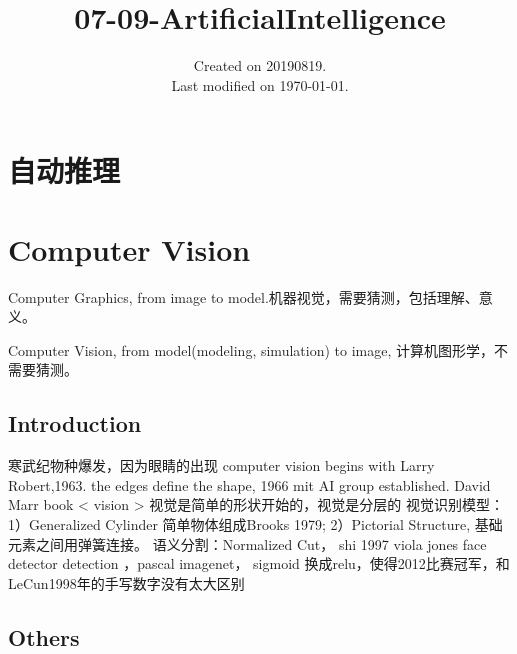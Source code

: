 \documentclass[UTF8]{../computerUniverse}
\begin{document}
\title{07-09-ArtificialIntelligence}
\date{Created on 20190819.\\   Last modified on \today.}
\maketitle
\tableofcontents


\chapter{自动推理}

\chapter{Computer Vision}


Computer Graphics, from image to model.机器视觉，需要猜测，包括理解、意义。

Computer Vision, from model(modeling, simulation) to image, 计算机图形学，不需要猜测。


\section{Introduction}
    寒武纪物种爆发，因为眼睛的出现
    computer vision begins with Larry Robert,1963. the edges define the shape, 1966 mit AI group established. 
    David Marr book < vision >
    视觉是简单的形状开始的，视觉是分层的
    视觉识别模型：1）Generalized Cylinder 简单物体组成Brooks 1979; 2）Pictorial Structure, 基础元素之间用弹簧连接。
    语义分割：Normalized Cut， shi 1997
    viola jones face detector
    detection ，pascal imagenet，
    sigmoid 换成relu，使得2012比赛冠军，和LeCun1998年的手写数字没有太大区别

\section{Others}
    
    
\end{document}
